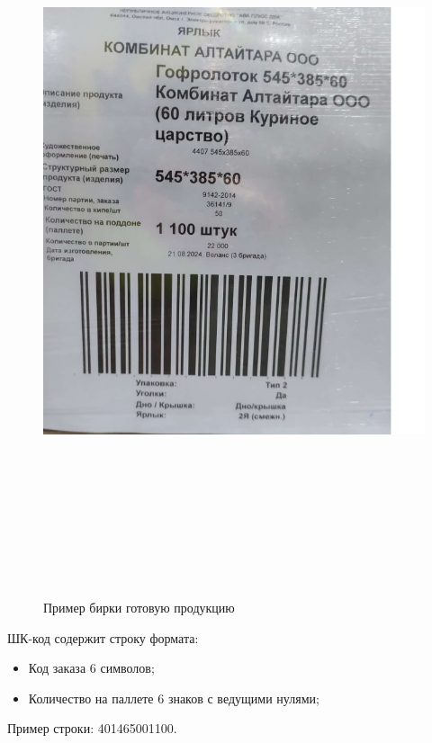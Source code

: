 \begin{figure}[!htb]
\centering
  \includegraphics[width=140mm, height=220mm, keepaspectratio]{50_Pics/Label.jpg}
\caption{Пример бирки готовую продукцию}
\label{pic:Label}
\end{figure} 
\FloatBarrier



ШК-код содержит строку формата: 
\begin{itemize}
    \item Код заказа 6 символов; %
    \item Количество на паллете 6 знаков с ведущими нулями;
\end{itemize}

Пример строки: 401465001100.